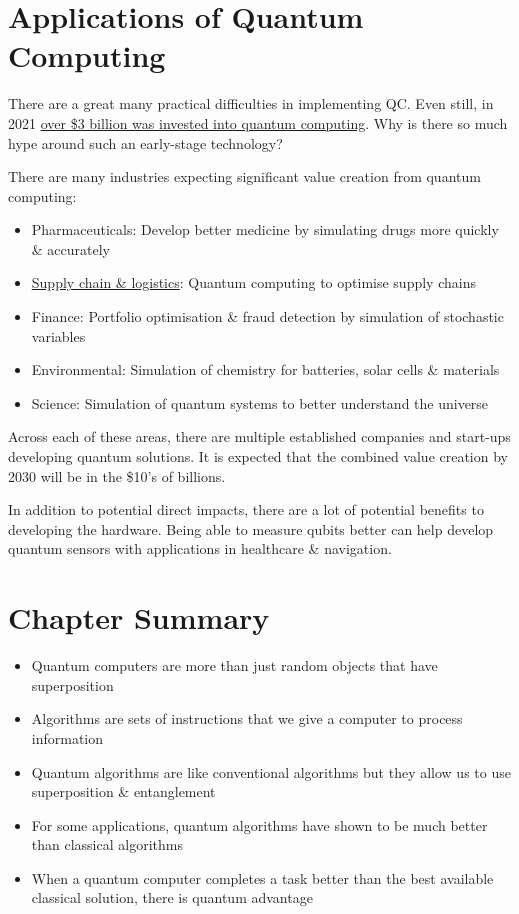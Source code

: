 \documentclass{book}
\begin{document}
\section{Applications of Quantum Computing}

There are a great many practical difficulties in implementing QC. Even still, in 2021 \href{https://www.mckinsey.com/business-functions/mckinsey-digital/our-insights/quantum-computing-funding-remains-strong-but-talent-gap-raises-concern}{over \$3 billion was invested into quantum computing}. Why is there so much hype around such an early-stage technology? 

There are many industries expecting significant value creation from quantum computing: 

\begin{itemize}
        
    \item Pharmaceuticals: Develop better medicine by simulating drugs more quickly \& accurately  
    \item \hyperlink{https://www.youtube.com/watch?v=jA7iopqDm94}{Supply chain \& logistics}: Quantum computing to optimise supply chains 
    \item Finance: Portfolio optimisation \& fraud detection by simulation of stochastic variables
    \item Environmental: Simulation of chemistry for batteries, solar cells \& materials
    \item Science: Simulation of quantum systems to better understand the universe
    
\end{itemize}


Across each of these areas, there are multiple established companies and start-ups developing quantum solutions. It is expected that the combined value creation by 2030 will be in the \$10's of billions. 

In addition to potential direct impacts, there are a lot of potential benefits to developing the hardware. Being able to measure qubits better can help develop quantum sensors with applications in healthcare \& navigation. 


\section{Chapter Summary}
\begin{itemize}
    \item Quantum computers are more than just random objects that have superposition
    \item Algorithms are sets of instructions that we give a computer to process information 
    \item Quantum algorithms are like conventional algorithms but they allow us to use superposition \& entanglement 
    \item For some applications, quantum algorithms have shown to be much better than classical algorithms
    \item When a quantum computer completes a task better than the best available classical solution, there is quantum advantage
\end{itemize}
\end{document}
